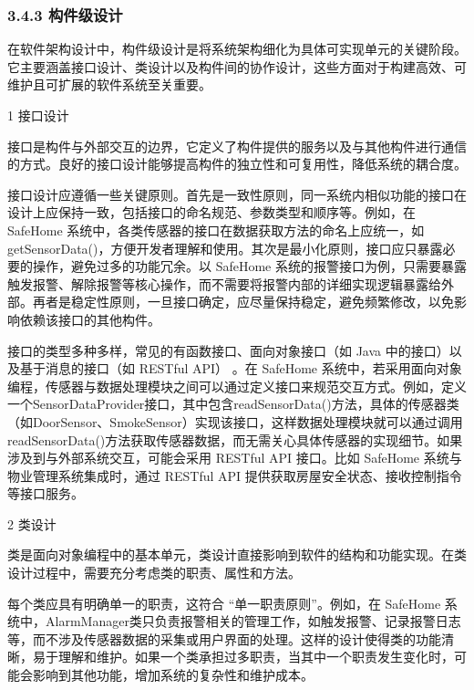 \hypertarget{ux6784ux4ef6ux7ea7ux8bbeux8ba1}{%
\subsubsection{3.4.3 构件级设计}\label{ux6784ux4ef6ux7ea7ux8bbeux8ba1}}

在软件架构设计中，构件级设计是将系统架构细化为具体可实现单元的关键阶段。它主要涵盖接口设计、类设计以及构件间的协作设计，这些方面对于构建高效、可维护且可扩展的软件系统至关重要。

1 接口设计

接口是构件与外部交互的边界，它定义了构件提供的服务以及与其他构件进行通信的方式。良好的接口设计能够提高构件的独立性和可复用性，降低系统的耦合度。

接口设计应遵循一些关键原则。首先是一致性原则，同一系统内相似功能的接口在设计上应保持一致，包括接口的命名规范、参数类型和顺序等。例如，在 SafeHome 系统中，各类传感器的接口在数据获取方法的命名上应统一，如getSensorData()，方便开发者理解和使用。其次是最小化原则，接口应只暴露必要的操作，避免过多的功能冗余。以 SafeHome 系统的报警接口为例，只需要暴露触发报警、解除报警等核心操作，而不需要将报警内部的详细实现逻辑暴露给外部。再者是稳定性原则，一旦接口确定，应尽量保持稳定，避免频繁修改，以免影响依赖该接口的其他构件。

接口的类型多种多样，常见的有函数接口、面向对象接口（如 Java 中的接口）以及基于消息的接口（如 RESTful API） 。在 SafeHome 系统中，若采用面向对象编程，传感器与数据处理模块之间可以通过定义接口来规范交互方式。例如，定义一个SensorDataProvider接口，其中包含readSensorData()方法，具体的传感器类（如DoorSensor、SmokeSensor）实现该接口，这样数据处理模块就可以通过调用readSensorData()方法获取传感器数据，而无需关心具体传感器的实现细节。如果涉及到与外部系统交互，可能会采用 RESTful API 接口。比如 SafeHome 系统与物业管理系统集成时，通过 RESTful API 提供获取房屋安全状态、接收控制指令等接口服务。

2 类设计

类是面向对象编程中的基本单元，类设计直接影响到软件的结构和功能实现。在类设计过程中，需要充分考虑类的职责、属性和方法。

每个类应具有明确单一的职责，这符合 ``单一职责原则''。例如，在 SafeHome 系统中，AlarmManager类只负责报警相关的管理工作，如触发报警、记录报警日志等，而不涉及传感器数据的采集或用户界面的处理。这样的设计使得类的功能清晰，易于理解和维护。如果一个类承担过多职责，当其中一个职责发生变化时，可能会影响到其他功能，增加系统的复杂性和维护成本。

